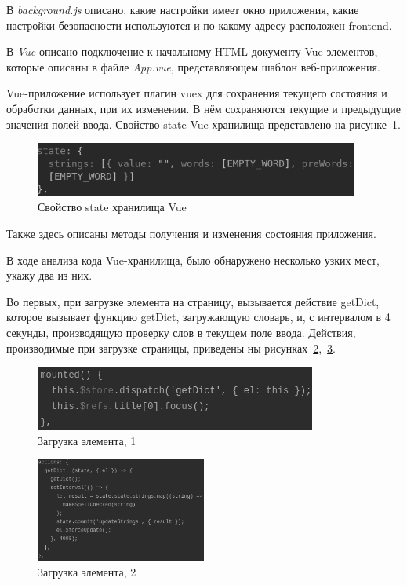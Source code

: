 В \emph{background.js} описано, какие настройки имеет окно приложения, какие настройки безопасности используются и по какому адресу расположен frontend.

В \emph{Vue} описано подключение к начальному HTML документу Vue-элементов, которые описаны в файле \emph{App.vue}, представляющем шаблон веб-приложения.

Vue-приложение использует плагин vuex для сохранения текущего состояния и обработки данных, при их изменении. В нём сохраняются текущие и предыдущие значения полей ввода. Свойство state Vue-хранилища представлено на рисунке~\ref{img:state}.

\begin{figure}[H]
  \centering
  \includegraphics[width=0.95\textwidth]{assets/images/practical/state.png}
  \caption{Свойство state хранилища Vue}
  \label{img:state}
\end{figure}

Также здесь описаны методы получения и изменения состояния приложения.

В ходе анализа кода Vue-хранилища, было обнаружено несколько узких мест, укажу два из них.

Во первых, при загрузке элемента на страницу, вызывается действие getDict, которое вызывает функцию getDict, загружающую словарь, и, с интервалом в 4 секунды, производящую проверку слов в текущем поле ввода. Действия, производимые при загрузке страницы, приведены ны рисунках~\ref{img:mount},~\ref{img:getDict}.

\begin{figure}[H]
  \centering
  \includegraphics[height=0.1\textheight]{assets/images/practical/mounted.png}
  \caption{Загрузка элемента, 1}
  \label{img:mount}
\end{figure}

\begin{figure}[H]
  \centering
  \includegraphics[width=0.5\textwidth]{assets/images/practical/getDict.png}
  \caption{Загрузка элемента, 2}
  \label{img:getDict}
\end{figure}

